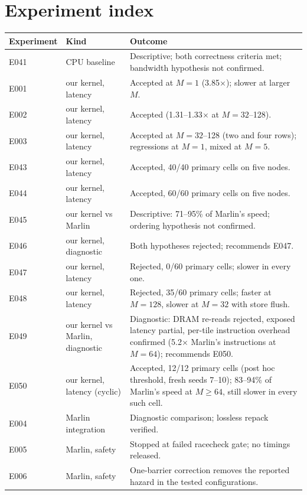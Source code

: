 \documentclass[sigconf,nonacm]{acmart}
\begin{document}
\appendix
\section{Experiment index}
\begin{table}[t]
\small
\begin{tabular}{p{}p{}p{}}
\toprule
Experiment & Kind & Outcome \\
\midrule
E041 & CPU baseline & Descriptive; both correctness criteria met; bandwidth hypothesis not confirmed. \\
E001 & our kernel, latency & Accepted at $M=1$ (3.85$\times$); slower at larger $M$. \\
E002 & our kernel, latency & Accepted (1.31--1.33$\times$ at $M=32$--128). \\
E003 & our kernel, latency & Accepted at $M=32$--128 (two and four rows); regressions at $M=1$, mixed at $M=5$. \\
E043 & our kernel, latency & Accepted, 40/40 primary cells on five nodes. \\
E044 & our kernel, latency & Accepted, 60/60 primary cells on five nodes. \\
E045 & our kernel vs Marlin & Descriptive: 71--95\% of Marlin's speed; ordering hypothesis not confirmed. \\
E046 & our kernel, diagnostic & Both hypotheses rejected; recommends E047. \\
E047 & our kernel, latency & Rejected, 0/60 primary cells; slower in every one. \\
E048 & our kernel, latency & Rejected, 35/60 primary cells; faster at $M=128$, slower at $M=32$ with store flush. \\
E049 & our kernel vs Marlin, diagnostic & Diagnostic: DRAM re-reads rejected, exposed latency partial, per-tile instruction overhead confirmed (5.2$\times$ Marlin's instructions at $M=64$); recommends E050. \\
E050 & our kernel, latency (cyclic) & Accepted, 12/12 primary cells (post hoc threshold, fresh seeds 7--10); 83--94\% of Marlin's speed at $M \ge 64$, still slower in every such cell. \\
E004 & Marlin integration & Diagnostic comparison; lossless repack verified. \\
E005 & Marlin, safety & Stopped at failed racecheck gate; no timings released. \\
E006 & Marlin, safety & One-barrier correction removes the reported hazard in the tested configurations. \\

\end{tabular}
\end{table}
\end{document}
